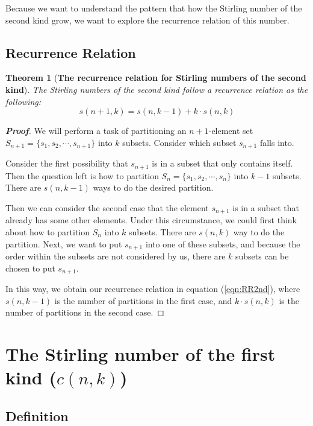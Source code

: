 \documentclass{article}
\newtheorem{theorem}{Theorem}[section]
\theoremstyle{definition}
\theoremstyle{remark}
\theoremstyle{example}
\begin{document}
Because we want to understand the pattern that how the Stirling number of the second kind grow, we want to explore the recurrence relation of this number.

\subsection{Recurrence Relation}
\begin{theorem}[\textbf{The recurrence relation for Stirling numbers of the second kind}]\label{thm:RR2nd}
    The Stirling numbers of the second kind follow a recurrence relation as the following:
    \begin{equation}\label{eqn:RR2nd}
        s(n+1,k) = s(n,k-1) + k\cdot s(n,k)
    \end{equation}
\end{theorem}

\begin{proof}[\textbf{Proof}]
    We will perform a task of partitioning an $n+1$-element set $S_{n+1} = \{s_1, s_2, \cdots, s_{n+1}\}$ into $k$ subsets. Consider which subset $s_{n+1}$ falls into. 
    
    Consider the first possibility that $s_{n+1}$ is in a subset that only contains itself. Then the question left is how to partition $S_n = \{s_1, s_2, \cdots, s_n\}$ into $k-1$ subsets. There are $s(n,k-1)$ ways to do the desired partition. 
    
    Then we can consider the second case that the element $s_{n+1}$ is in a subset that already has some other elements. Under this circumstance, we could first think about how to partition $S_{n}$ into $k$ subsets. There are $s(n,k)$ way to do the partition. Next, we want to put $s_{n+1}$ into one of these subsets, and because the order within the subsets are not considered by us, there are $k$ subsets can be chosen to put $s_{n+1}$.
    
    In this way, we obtain our recurrence relation in equation (\ref{eqn:RR2nd}), where $s(n,k-1)$ is the number of partitions in the first case, and $k\cdot s(n,k)$ is the number of partitions in the second case.
\end{proof}

\section{\textbf{The Stirling number of the first kind ($c(n,k)$)}}
\subsection{Definition}
\end{document}
